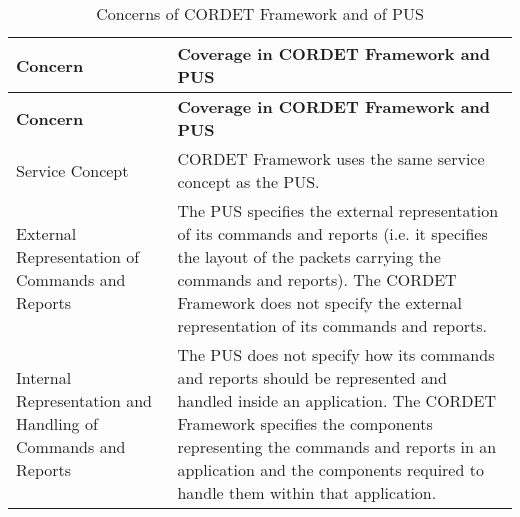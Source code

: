 \begin{longtable}{|>{\raggedright\arraybackslash}p{3cm}|p{10cm}|}
\caption{Concerns of CORDET Framework and of PUS}\label{tab:PusCrConcerns} \\
\hline
\rowcolor{light-gray}
\textbf{Concern} & \textbf{Coverage in CORDET Framework and PUS}\\
\hline\hline
\endfirsthead
\rowcolor{light-gray}
\textbf{Concern} & \textbf{Coverage in CORDET Framework and PUS}\\
\hline\hline
\endhead
Service Concept & CORDET Framework uses the same service concept as the PUS.\\
\hline
External Representation of Commands and Reports & The PUS specifies the external representation of its commands and reports (i.e. it specifies the layout of the packets carrying the commands and reports). The CORDET Framework does not specify the external representation of its commands and reports.\\
\hline
Internal Representation and Handling of Commands and Reports & The PUS does not specify how its commands and reports should be represented and handled inside an application. The CORDET Framework specifies the components representing the commands and reports in an application and the components required to handle them within that application.\\
\hline
\end{longtable}

